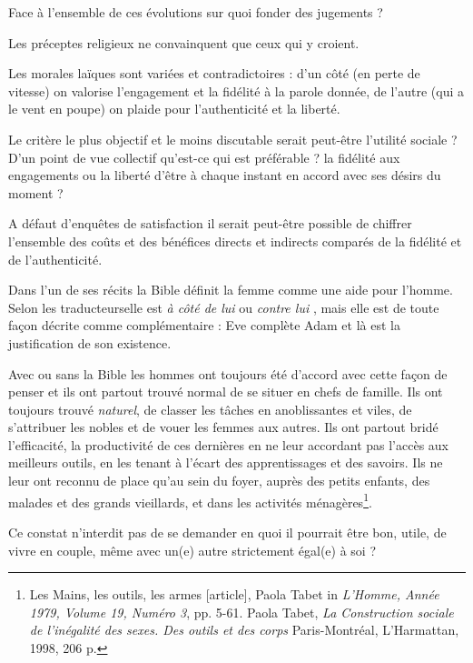 Face à l'ensemble de ces évolutions sur quoi fonder des jugements ? 

Les préceptes religieux ne convainquent que ceux qui y croient. 

Les morales laïques sont variées et contradictoires : d'un côté (en perte de vitesse) on valorise l'engagement et la fidélité à la parole donnée, de l'autre (qui a le vent en poupe) on plaide pour l'authenticité et la liberté. 

Le critère le plus objectif et le moins discutable serait peut-être l'utilité sociale ? D’un point de vue collectif qu'est-ce qui est préférable ? la fidélité aux engagements ou la liberté d'être à chaque instant en accord avec ses désirs du moment ?  

A défaut d'enquêtes de satisfaction il serait peut-être possible de chiffrer l'ensemble des coûts et des bénéfices directs et indirects comparés de la fidélité et de l'authenticité.

Dans l’un de ses récits la Bible définit la femme comme une aide pour l’homme. Selon les traducteurselle est \emph{à côté de lui} ou \emph{contre lui} , mais elle est de toute façon décrite comme complémentaire : Eve complète Adam et là est la justification de son existence. 

Avec ou sans la Bible les hommes ont toujours été d'accord avec cette façon de penser et ils ont partout trouvé normal de se situer en chefs de famille. Ils ont toujours trouvé \emph{naturel}, de classer les tâches en anoblissantes et viles, de s'attribuer les nobles et de vouer les femmes aux autres. Ils ont partout bridé l’efficacité, la productivité de ces dernières en ne leur accordant pas l’accès aux meilleurs outils, en les tenant à l’écart des apprentissages et des savoirs. Ils ne leur ont reconnu de place qu’au sein du foyer, auprès des petits enfants, des malades et des grands vieillards, et dans les activités ménagères\footnote{Les Mains, les outils, les armes [article], Paola Tabet
in \emph{L'Homme, Année 1979, Volume 19, Numéro 3}, pp. 5-61.
Paola Tabet, \emph{La Construction sociale de l’inégalité des sexes. Des outils et des corps}
Paris-Montréal, L’Harmattan, 1998, 206 p.}. 


Ce constat n'interdit pas de se demander en quoi il pourrait être bon, utile, de vivre en couple, même avec un(e) autre strictement égal(e) à soi  ? 
 

